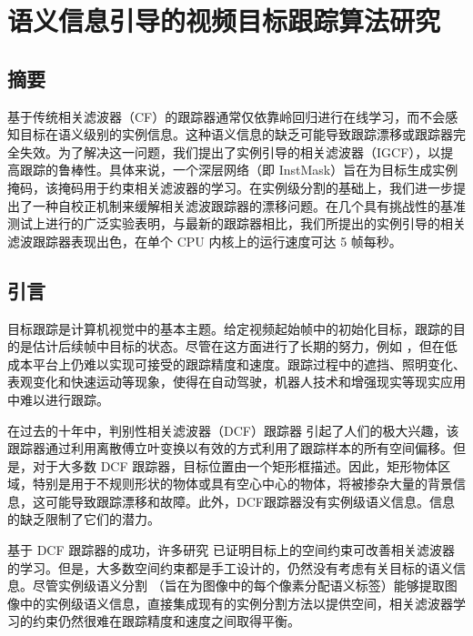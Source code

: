 \chapter{语义信息引导的视频目标跟踪算法研究}\label{chap:IGCF}

\section{摘要}
基于传统相关滤波器（CF）的跟踪器通常仅依靠岭回归进行在线学习，而不会感知目标在语义级别的实例信息。这种语义信息的缺乏可能导致跟踪漂移或跟踪器完全失效。为了解决这一问题，我们提出了实例引导的相关滤波器（IGCF），以提高跟踪的鲁棒性。具体来说，一个深层网络（即 InstMask）旨在为目标生成实例掩码，该掩码用于约束相关滤波器的学习。在实例级分割的基础上，我们进一步提出了一种自校正机制来缓解相关滤波跟踪器的漂移问题。在几个具有挑战性的基准测试上进行的广泛实验表明，与最新的跟踪器相比，我们所提出的实例引导的相关滤波跟踪器表现出色，在单个 CPU 内核上的运行速度可达 5 帧每秒。

\section{引言}
目标跟踪是计算机视觉中的基本主题。给定视频起始帧中的初始化目标，跟踪的目的是估计后续帧中目标的状态。尽管在这方面进行了长期的努力，例如 \cite{Leang2018OnlineFO, Wang2019VisualOT, Zhang2018UsingFL}，但在低成本平台上仍难以实现可接受的跟踪精度和速度。跟踪过程中的遮挡、照明变化、表观变化和快速运动等现象，使得在自动驾驶，机器人技术和增强现实等现实应用中难以进行跟踪。

在过去的十年中，判别性相关滤波器（DCF）跟踪器 \cite{bolme2010visual, Zhang2018VisualTU} 引起了人们的极大兴趣，该跟踪器通过利用离散傅立叶变换以有效的方式利用了跟踪样本的所有空间偏移。但是，对于大多数 DCF 跟踪器，目标位置由一个矩形框描述。因此，矩形物体区域，特别是用于不规则形状的物体或具有空心中心的物体，将被掺杂大量的背景信息，这可能导致跟踪漂移和故障。此外，DCF跟踪器没有实例级语义信息。信息的缺乏限制了它们的潜力。

基于 DCF 跟踪器的成功，许多研究 \cite{Danelljan2015LearningSR, Lukezic2017DiscriminativeCF} 已证明目标上的空间约束可改善相关滤波器的学习。但是，大多数空间约束都是手工设计的，仍然没有考虑有关目标的语义信息。尽管实例级语义分割 \cite{Pinheiro2015LearningTS, Zhang2019ProgressivelyDN}（旨在为图像中的每个像素分配语义标签）能够提取图像中的实例级语义信息，直接集成现有的实例分割方法以提供空间，相关滤波器学习的约束仍然很难在跟踪精度和速度之间取得平衡。

